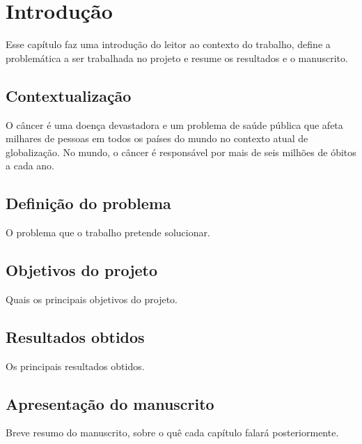  


\chapter{Introdução} \label{Chap:Intro}


Esse capítulo faz uma introdução do leitor ao contexto do trabalho,
define a problemática a ser trabalhada no projeto e resume os resultados
e o manuscrito.


\section{Contextualização}

O câncer é uma doença devastadora e um problema de saúde pública que
afeta milhares de pessoas em todos os países do mundo no contexto
atual de globalização. No mundo, o câncer é responsável por mais de
seis milhões de óbitos a cada ano. 



\section{Definição do problema}

O problema que o trabalho pretende solucionar.


\section{Objetivos do projeto}

Quais os principais objetivos do projeto.


\section{Resultados obtidos}

Os principais resultados obtidos.


\section{Apresentação do manuscrito}

Breve resumo do manuscrito, sobre o quê cada capítulo falará posteriormente.
